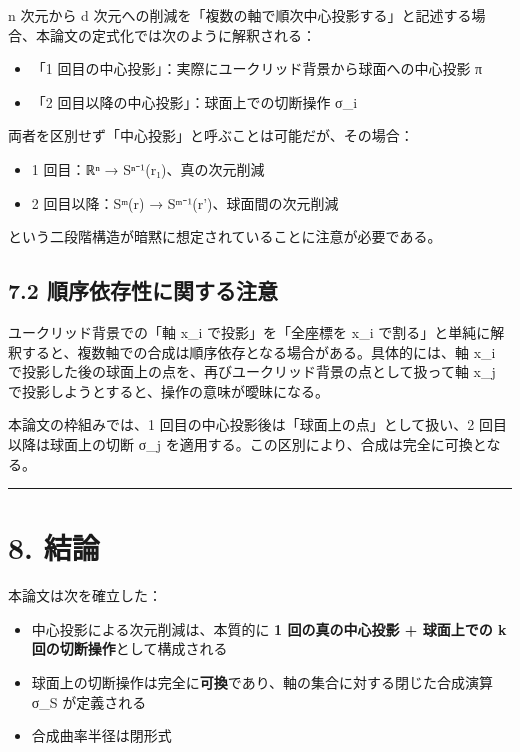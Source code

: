\documentclass[a4paper,11pt]{ltjsarticle}
\theoremstyle{definition}
\theoremstyle{remark}
\providecommand{\tightlist}{%
  \setlength{\itemsep}{0pt}\setlength{\parskip}{0pt}}
\begin{document}
n 次元から d
次元への削減を「複数の軸で順次中心投影する」と記述する場合、本論文の定式化では次のように解釈される：

\begin{itemize}
\tightlist
\item
  「1 回目の中心投影」：実際にユークリッド背景から球面への中心投影 π
\item
  「2 回目以降の中心投影」：球面上での切断操作 σ\_i
\end{itemize}

両者を区別せず「中心投影」と呼ぶことは可能だが、その場合：

\begin{itemize}
\tightlist
\item
  1 回目：ℝⁿ → Sⁿ⁻¹(r₁)、真の次元削減
\item
  2 回目以降：Sᵐ(r) → Sᵐ⁻¹(r')、球面間の次元削減
\end{itemize}

という二段階構造が暗黙に想定されていることに注意が必要である。

\subsection{7.2
順序依存性に関する注意}\label{ux9806ux5e8fux4f9dux5b58ux6027ux306bux95a2ux3059ux308bux6ce8ux610f}

ユークリッド背景での「軸 x\_i で投影」を「全座標を x\_i
で割る」と単純に解釈すると、複数軸での合成は順序依存となる場合がある。具体的には、軸
x\_i で投影した後の球面上の点を、再びユークリッド背景の点として扱って軸
x\_j で投影しようとすると、操作の意味が曖昧になる。

本論文の枠組みでは、1 回目の中心投影後は「球面上の点」として扱い、2
回目以降は球面上の切断 σ\_j
を適用する。この区別により、合成は完全に可換となる。

\begin{center}\rule{0.5\linewidth}{0.5pt}\end{center}

\section{8. 結論}\label{ux7d50ux8ad6}

本論文は次を確立した：

\begin{itemize}
\tightlist
\item
  中心投影による次元削減は、本質的に \textbf{1 回の真の中心投影 +
  球面上での k 回の切断操作}として構成される
\item
  球面上の切断操作は完全に\textbf{可換}であり、軸の集合に対する閉じた合成演算
  σ\_S が定義される
\item
  合成曲率半径は閉形式
\end{itemize}
\end{document}

